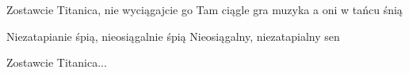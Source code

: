 \documentclass[../../../songbook.tex]{subfiles}
\begin{document}
\-\hspace{1cm} Zostawcie Titanica, nie wyciągajcie go 		 \newline	
\-\hspace{1cm} Tam ciągle gra muzyka a oni w tańcu śnią	 \newline	

Niezatapianie śpią, nieosiągalnie śpią	 \newline	
Nieosiągalny, niezatapialny sen			 \newline	

\-\hspace{1cm} Zostawcie Titanica...
\end{document}
